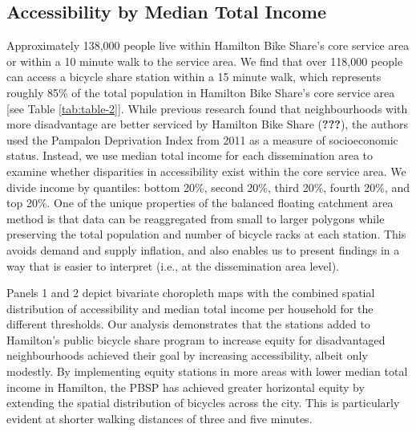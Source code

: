 \documentclass[]{elsarticle} %
\begin{document}
\hypertarget{accessibility-by-median-total-income}{%
\subsection{Accessibility by Median Total
Income}\label{accessibility-by-median-total-income}}

Approximately 138,000 people live within Hamilton Bike Share's core
service area or within a 10 minute walk to the service area. We find
that over 118,000 people can access a bicycle share station within a 15
minute walk, which represents roughly 85\% of the total population in
Hamilton Bike Share's core service area {[}see Table
\ref{tab:table-2}{]}. While previous research found that neighbourhoods
with more disadvantage are better serviced by Hamilton Bike Share
({\textbf{???}}), the authors used the Pampalon Deprivation Index from
2011 as a measure of socioeconomic status. Instead, we use median total
income for each dissemination area to examine whether disparities in
accessibility exist within the core service area. We divide income by
quantiles: bottom 20\%, second 20\%, third 20\%, fourth 20\%, and top
20\%. One of the unique properties of the balanced floating catchment
area method is that data can be reaggregated from small to larger
polygons while preserving the total population and number of bicycle
racks at each station. This avoids demand and supply inflation, and also
enables us to present findings in a way that is easier to interpret
(i.e., at the dissemination area level).

Panels 1 and 2 depict bivariate choropleth maps with the combined
spatial distribution of accessibility and median total income per
household for the different thresholds. Our analysis demonstrates that
the stations added to Hamilton's public bicycle share program to
increase equity for disadvantaged neighbourhoods achieved their goal by
increasing accessibility, albeit only modestly. By implementing equity
stations in more areas with lower median total income in Hamilton, the
PBSP has achieved greater horizontal equity by extending the spatial
distribution of bicycles across the city. This is particularly evident
at shorter walking distances of three and five minutes.
\end{document}
